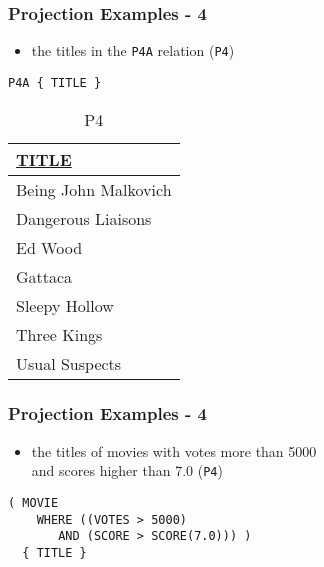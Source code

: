 \documentclass[dvipsnames]{beamer}
\theoremstyle{plain}
\begin{document}
\begin{frame}[fragile]
  \frametitle{Projection Examples - 4}

  \begin{example}
    \begin{itemize}
      \item the titles in the \texttt{P4A} relation (\texttt{P4})
    \end{itemize}

    \begin{lstlisting}
P4A { TITLE }
    \end{lstlisting}

    \pause
    \vspace{-10pt}
    \begin{tiny}
    \begin{table}
      \caption{P4}
      \begin{tabular}{|l|}\hline
\underline{TITLE}   \\[2pt]\hline\hline
Being John Malkovich\\\hline
Dangerous Liaisons  \\\hline
Ed Wood             \\\hline
Gattaca             \\\hline
Sleepy Hollow       \\\hline
Three Kings         \\\hline
Usual Suspects      \\\hline
      \end{tabular}
    \end{table}
    \end{tiny}
  \end{example}
\end{frame}

\begin{frame}[fragile]
  \frametitle{Projection Examples - 4}

  \begin{example}
    \begin{itemize}
      \item the titles of movies with votes more than 5000\\
        and scores higher than 7.0 (\texttt{P4})
    \end{itemize}

    \begin{lstlisting}
( MOVIE
    WHERE ((VOTES > 5000)
       AND (SCORE > SCORE(7.0))) )
  { TITLE }
    \end{lstlisting}
  \end{example}
\end{frame}
\end{document}
